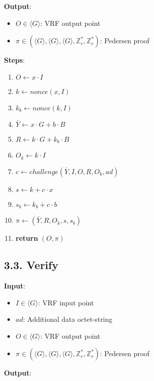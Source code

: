 \documentclass[
]{article}
\providecommand{\tightlist}{%
  \setlength{\itemsep}{0pt}\setlength{\parskip}{0pt}}
\begin{document}
\textbf{Output}:

\begin{itemize}
\tightlist
\item
  \(O \in \langle G \rangle\): VRF output point
\item
  \(\pi \in (\langle G \rangle, \langle G \rangle, \langle G \rangle, \mathbb{Z}^*_r, \mathbb{Z}^*_r)\):
  Pedersen proof
\end{itemize}

\textbf{Steps}:

\begin{enumerate}
\def\labelenumi{\arabic{enumi}.}
\tightlist
\item
  \(O \leftarrow x \cdot I\)
\item
  \(k \leftarrow nonce(x, I)\)
\item
  \(k_b \leftarrow nonce(k, I)\)
\item
  \(\bar{Y} \leftarrow x \cdot G + b \cdot B\)
\item
  \(R \leftarrow k \cdot G + k_b \cdot B\)
\item
  \(O_k \leftarrow k \cdot I\)
\item
  \(c \leftarrow challenge(\bar{Y}, I, O, R, O_k, ad)\)
\item
  \(s \leftarrow k + c \cdot x\)
\item
  \(s_b \leftarrow k_b + c \cdot b\)
\item
  \(\pi \leftarrow (\bar{Y}, R, O_k, s, s_b)\)
\item
  \textbf{return} \((O, \pi)\)
\end{enumerate}

\hypertarget{verify-1}{%
\subsection{3.3. Verify}\label{verify-1}}

\textbf{Input}:

\begin{itemize}
\tightlist
\item
  \(I \in \langle G \rangle\): VRF input point
\item
  \(ad\): Additional data octet-string
\item
  \(O \in \langle G \rangle\): VRF output point
\item
  \(\pi \in (\langle G \rangle, \langle G \rangle, \langle G \rangle, \mathbb{Z}^*_r, \mathbb{Z}^*_r)\):
  Pedersen proof
\end{itemize}

\textbf{Output}:
\end{document}
